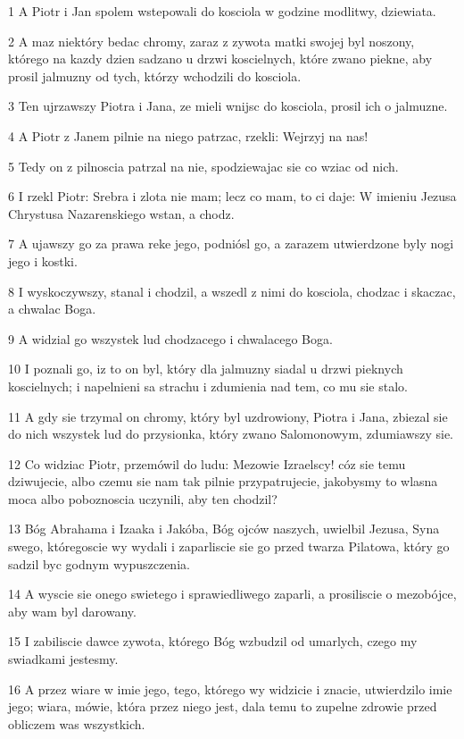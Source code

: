\par 1 A Piotr i Jan spolem wstepowali do kosciola w godzine modlitwy, dziewiata.
\par 2 A maz niektóry bedac chromy, zaraz z zywota matki swojej byl noszony, którego na kazdy dzien sadzano u drzwi koscielnych, które zwano piekne, aby prosil jalmuzny od tych, którzy wchodzili do kosciola.
\par 3 Ten ujrzawszy Piotra i Jana, ze mieli wnijsc do kosciola, prosil ich o jalmuzne.
\par 4 A Piotr z Janem pilnie na niego patrzac, rzekli: Wejrzyj na nas!
\par 5 Tedy on z pilnoscia patrzal na nie, spodziewajac sie co wziac od nich.
\par 6 I rzekl Piotr: Srebra i zlota nie mam; lecz co mam, to ci daje: W imieniu Jezusa Chrystusa Nazarenskiego wstan, a chodz.
\par 7 A ujawszy go za prawa reke jego, podniósl go, a zarazem utwierdzone byly nogi jego i kostki.
\par 8 I wyskoczywszy, stanal i chodzil, a wszedl z nimi do kosciola, chodzac i skaczac, a chwalac Boga.
\par 9 A widzial go wszystek lud chodzacego i chwalacego Boga.
\par 10 I poznali go, iz to on byl, który dla jalmuzny siadal u drzwi pieknych koscielnych; i napelnieni sa strachu i zdumienia nad tem, co mu sie stalo.
\par 11 A gdy sie trzymal on chromy, który byl uzdrowiony, Piotra i Jana, zbiezal sie do nich wszystek lud do przysionka, który zwano Salomonowym, zdumiawszy sie.
\par 12 Co widziac Piotr, przemówil do ludu: Mezowie Izraelscy! cóz sie temu dziwujecie, albo czemu sie nam tak pilnie przypatrujecie, jakobysmy to wlasna moca albo poboznoscia uczynili, aby ten chodzil?
\par 13 Bóg Abrahama i Izaaka i Jakóba, Bóg ojców naszych, uwielbil Jezusa, Syna swego, któregoscie wy wydali i zaparliscie sie go przed twarza Pilatowa, który go sadzil byc godnym wypuszczenia.
\par 14 A wyscie sie onego swietego i sprawiedliwego zaparli, a prosiliscie o mezobójce, aby wam byl darowany.
\par 15 I zabiliscie dawce zywota, którego Bóg wzbudzil od umarlych, czego my swiadkami jestesmy.
\par 16 A przez wiare w imie jego, tego, którego wy widzicie i znacie, utwierdzilo imie jego; wiara, mówie, która przez niego jest, dala temu to zupelne zdrowie przed obliczem was wszystkich.
